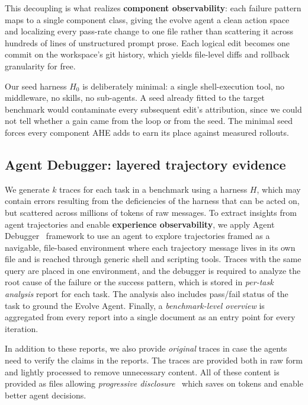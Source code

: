 This decoupling is what realizes \textbf{component observability}: each failure pattern maps to a single component class, giving the evolve agent a clean action space and localizing every pass-rate change to one file rather than scattering it across hundreds of lines of unstructured prompt prose. Each logical edit becomes one commit on the workspace's git history, which yields file-level diffs and rollback granularity for free.

Our seed harness $H_0$ is deliberately minimal: a single shell-execution tool, no middleware, no skills, no sub-agents. A seed already fitted to the target benchmark would contaminate every subsequent edit's attribution, since we could not tell whether a gain came from the loop or from the seed. The minimal seed forces every component AHE adds to earn its place against measured rollouts.


\subsection{Agent Debugger: layered trajectory evidence}
\label{sec:method:adb}

We generate $k$ traces for each task in a benchmark using a harness $H$, which may contain errors resulting from the deficiencies of the harness that can be acted on, but scattered across millions of tokens of raw messages. To extract insights from agent trajectories and enable \textbf{experience observability}, we apply Agent Debugger~\citep{linAgentDebuggerUnderstanding2026} framework to use an agent to explore trajectories framed as a navigable, file-based environment where each trajectory message lives in its own file and is reached through generic shell and scripting tools. Traces with the same query are placed in one environment, and the debugger is required to analyze the root cause of the failure or the success pattern, which is stored in \emph{per-task analysis} report for each task. The analysis also includes pass/fail status of the task to ground the Evolve Agent. Finally, a \emph{benchmark-level overview} is aggregated from every report into a single document as an entry point for every iteration. 

In addition to these reports, we also provide \emph{original} traces in case the agents need to verify the claims in the reports. The traces are provided both in raw form and lightly processed to remove unnecessary content. All of these content is provided as files allowing \textit{progressive disclosure}~\citep{EffectiveContextEngineering} which saves on tokens and enable better agent decisions.


